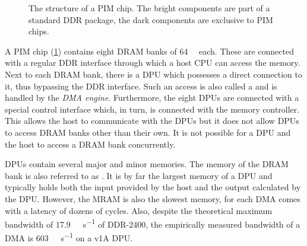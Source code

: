 \begin{figure}

	\caption{
		The structure of a \ac{PIM} chip.
		The bright components are part of a standard \ac{DDR} package, the dark components are exclusive to \ac{PIM} chips.~\cite{upmem2019HotChips}
	}
	\label{fig:arch:chip}
\end{figure}

A \ac{PIM} chip (\cref{fig:arch:chip}) contains eight \ac{DRAM} banks of \qty{64}{\mebi\byte} each.
These are connected with a regular \ac{DDR} interface through which a host \ac{CPU} can access the memory.
Next to each \ac{DRAM} bank, there is a \ac{DPU} which possesses a direct connection to it, thus bypassing the \ac{DDR} interface.
Such an access is also called a  and is handled by the \emph{\ac{DMA} engine}.
Furthermore, the eight \acp{DPU} are connected with a special control interface which, in turn, is connected with the memory controller.
This allows the host to communicate with the \acp{DPU} but it does not allow \acp{DPU} to access \ac{DRAM} banks other than their own.
It is not possible for a \ac{DPU} and the host to access a \ac{DRAM} bank concurrently.

\Acp{DPU} contain several major and minor memories.
The memory of the \ac{DRAM} bank is also referred to as .
It is by far the largest memory of a \ac{DPU} and typically holds both the input provided by the host and the output calculated by the \ac{DPU}.
However, the \ac{MRAM} is also the slowest memory, for each \ac{DMA} comes with a latency of dozens of cycles.
Also, despite the theoretical maximum bandwidth of \qty{17.9}{\gibi\byte\per\second} of \ac{DDR}-2400, the empirically measured bandwidth of a \ac{DMA} is \qty{603}{\mebi\byte\per\second} on a v1A \ac{DPU}.

